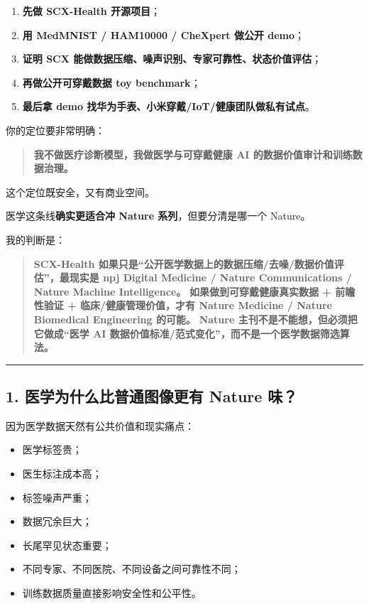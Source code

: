 \documentclass[
  12pt,
]{ctexart}
\providecommand{\tightlist}{%
  \setlength{\itemsep}{0pt}\setlength{\parskip}{0pt}}
\begin{document}
\begin{enumerate}
\def\labelenumi{\arabic{enumi}.}
\tightlist
\item
  \textbf{先做 SCX-Health 开源项目}；
\item
  \textbf{用 MedMNIST / HAM10000 / CheXpert 做公开 demo}；
\item
  \textbf{证明 SCX 能做数据压缩、噪声识别、专家可靠性、状态价值评估}；
\item
  \textbf{再做公开可穿戴数据 toy benchmark}；
\item
  \textbf{最后拿 demo 找华为手表、小米穿戴/IoT/健康团队做私有试点}。
\end{enumerate}

你的定位要非常明确：

\begin{quote}
\textbf{我不做医疗诊断模型，我做医学与可穿戴健康 AI
的数据价值审计和训练数据治理。}
\end{quote}

这个定位既安全，又有商业空间。

医学这条线\textbf{确实更适合冲 Nature 系列}，但要分清是哪一个 Nature。

我的判断是：

\begin{quote}
\textbf{SCX-Health
如果只是``公开医学数据上的数据压缩/去噪/数据价值评估''，最现实是 npj
Digital Medicine / Nature Communications / Nature Machine
Intelligence。} \textbf{如果做到可穿戴健康真实数据 + 前瞻性验证 +
临床/健康管理价值，才有 Nature Medicine / Nature Biomedical Engineering
的可能。} \textbf{Nature 主刊不是不能想，但必须把它做成``医学 AI
数据价值标准/范式变化''，而不是一个医学数据筛选算法。}
\end{quote}

\begin{center}\rule{0.5\linewidth}{0.5pt}\end{center}

\subsection{1. 医学为什么比普通图像更有 Nature
味？}\label{ux533bux5b66ux4e3aux4ec0ux4e48ux6bd4ux666eux901aux56feux50cfux66f4ux6709-nature-ux5473}

因为医学数据天然有公共价值和现实痛点：

\begin{itemize}
\tightlist
\item
  医学标签贵；
\item
  医生标注成本高；
\item
  标签噪声严重；
\item
  数据冗余巨大；
\item
  长尾罕见状态重要；
\item
  不同专家、不同医院、不同设备之间可靠性不同；
\item
  训练数据质量直接影响安全性和公平性。
\end{itemize}
\end{document}
